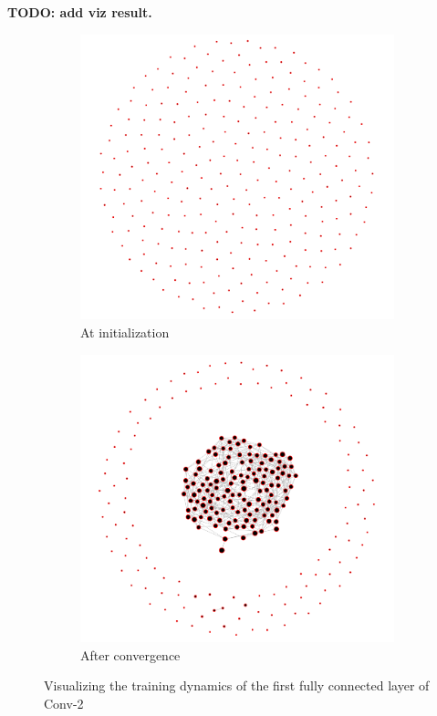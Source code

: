 \textbf{TODO: add viz result.}

\begin{figure}[H]
\centering
\begin{subfigure}[b]{0.62\textwidth}
   \includegraphics[width=\linewidth]{images/conv2-fc1-init.png}
   \caption{At initialization}
   \label{fig:conv2-fc1-init} 
\end{subfigure}

\begin{subfigure}[b]{0.62\textwidth}
   \includegraphics[width=\linewidth]{images/conv2-fc1-final.png}
   \caption{After convergence}
   \label{fig:conv2-fc1-final}
\end{subfigure}
\caption{Visualizing the training dynamics of the first fully connected layer of Conv-2}
\end{figure}

